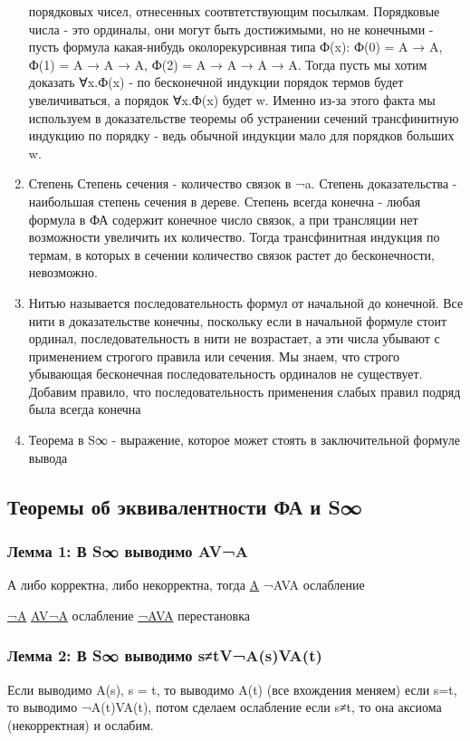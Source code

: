 \documentclass[11pt]{article}
\begin{document}
\begin{enumerate}
порядковых чисел, отнесенных соотвтетствующим посылкам.
Порядковые числа - это ординалы, они могут быть достижимыми,
но не конечными - пусть формула какая-нибудь околорекурсивная
типа Ф(x): Ф(0) = A → A, Ф(1) = A → A → A, Ф(2) = A → A → A → A.
Тогда пусть мы хотим доказать ∀x.Ф(x) - по бесконечной
индукции порядок термов будет увеличиваться, а порядок
∀x.Ф(x) будет w. Именно из-за этого факта мы используем
в доказательстве теоремы об устранении сечений трансфинитную
индукцию по порядку - ведь обычной индукции мало для порядков
больших w.
\item Степень
Степень сечения - количество связок в ¬a.
Степень доказательства - наибольшая степень сечения в дереве.
Степень всегда конечна - любая формула в ФА содержит конечное
число связок, а при трансляции нет возможности увеличить
их количество. Тогда трансфинитная индукция по термам, в
которых в сечении количество связок растет до бесконечности,
невозможно.

\item Нитью называется последовательность формул от начальной до
конечной. Все нити в доказательстве конечны, поскольку если в начальной
формуле стоит ординал, последовательность в нити не возрастает, а эти
числа убывают с применением строгого правила или сечения. Мы знаем,
что строго убывающая бесконечная последовательность ординалов не существует.
Добавим правило, что последовательность применения слабых правил подряд
была всегда конечна
\item Теорема в S∞ - выражение, которое может стоять в заключительной формуле
вывода
\end{enumerate}
\subsection{Теоремы об эквивалентности ФА и S∞}
\label{sec-18-3}
\subsubsection{Лемма 1: В S∞ выводимо AV¬A}
\label{sec-18-3-1}
А либо корректна, либо некорректна, тогда
\uline{A}
¬AVA     ослабление

\uline{¬A}
\uline{AV¬A}   ослабление
\uline{¬AVA}   перестановка
\subsubsection{Лемма 2: В S∞ выводимо s≠tV¬A(s)VA(t)}
\label{sec-18-3-2}
Если выводимо A(s), s = t, то выводимо A(t) (все вхождения меняем)
если s=t, то выводимо ¬A(t)VA(t), потом сделаем ослабление
если s≠t, то она аксиома (некорректная) и ослабим.
\end{document}
